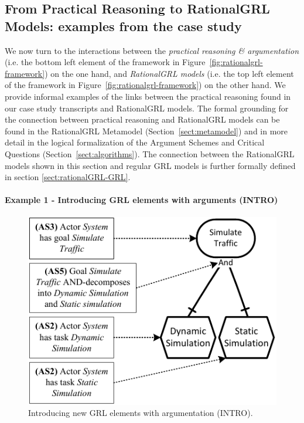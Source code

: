 \subsection{From Practical Reasoning to RationalGRL Models: examples from the case study}
\label{sect:overview:examples}

We now turn to the interactions between the \emph{practical reasoning \& argumentation} (i.e. the bottom left element of the framework in Figure~\ref{fig:rationalgrl-framework}) on the one hand, and \emph{RationalGRL models} (i.e. the top left element of the framework in Figure~\ref{fig:rationalgrl-framework}) on the other hand. We provide informal examples of the links between the practical reasoning found in our case study transcripts and RationalGRL models. The formal grounding for the connection between practical reasoning and RationalGRL models can be found in the RationalGRL Metamodel (Section~\ref{sect:metamodel}) and in more detail in the logical formalization of the Argument Schemes and Critical Questions (Section~\ref{sect:algorithms}). The connection between the RationalGRL models shown in this section and regular GRL models is further formally defined in section \ref{sect:rationalGRL-GRL}. 

\paragraph{Example 1 - Introducing GRL elements with arguments (\textsf{INTRO)}}

\begin{figure}[t]
\centering
\includegraphics[width=\columnwidth]{img/fig_example_AS.pdf}
\caption{Introducing new GRL elements with argumentation (\textsf{INTRO)}.}
\label{fig:example_AS}
\end{figure}

